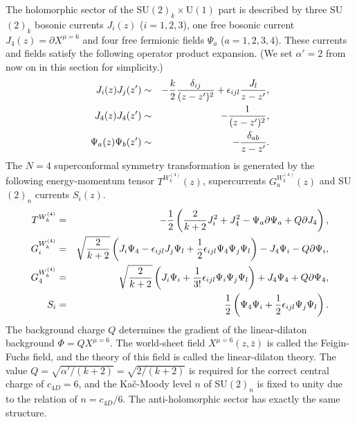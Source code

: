 \documentclass[a4paper,prd,preprint]{revtex4}
\begin{document}
The holomorphic sector of the SU$(2)_k \times$U$(1)$ part
 is described by three SU$(2)_k$ bosonic currents $J_i(z)$
 ($i = 1,2,3$), one free bosonic current $J_4(z)=\partial X^{\mu=6}$
 and four free fermionic fields $\Psi_a$ ($a=1,2,3,4$).
These currents and fields satisfy
 the following operator product expansion.
(We set $\alpha'=2$ from now on in this section for simplicity.)
\begin{eqnarray}
 J_i(z) J_j(z') &\sim&
  - { k \over 2} {{\delta_{ij}} \over {(z-z')^2}}
  + \epsilon_{ijl} {{J_l} \over {z-z'}},
\\
 J_4(z) J_4(z') &\sim& - {1 \over {(z-z')^2}},
\\
 \Psi_a(z) \Psi_b(z') &\sim& - {{\delta_{ab}} \over {z-z'}}.
\end{eqnarray}
The $N=4$ superconformal symmetry transformation is generated
 by the following energy-momentum tensor $T^{W^{(4)}_k}(z)$,
 supercurrents $G^{W^{(4)}_k}_a(z)$ and SU$(2)_n$ currents $S_i(z)$.
\begin{eqnarray}
 T^{W^{(4)}_k} &=&
  - {1 \over 2}
  \left(
   {2 \over {k+2}} J_i^2 + J_4^2
   - \Psi_a \partial \Psi_a + Q \partial J_4
  \right),
\\
 G^{W^{(4)}_k}_i &=&
  \sqrt{{2 \over {k+2}}}
   \left(
    J_i \Psi_4 - \epsilon_{ijl} J_j \Psi_l
    + {1 \over 2} \epsilon_{ijl} \Psi_4 \Psi_j \Psi_l
   \right)
  - J_4 \Psi_i - Q \partial \Psi_i,
\\
 G^{W^{(4)}_k}_4 &=&
  \sqrt{{2 \over {k+2}}}
   \left(
    J_i \Psi_i + {1 \over {3!}} \epsilon_{ijl} \Psi_i \Psi_j \Psi_l
   \right)
  + J_4 \Psi_4 + Q \partial \Psi_4,
\\
 S_i &=&
  {1 \over 2}
  \left(
   \Psi_4 \Psi_i + {1 \over 2} \epsilon_{ijl} \Psi_j \Psi_l
  \right).
\end{eqnarray}
The background charge $Q$
 determines the gradient of the linear-dilaton background
 $\Phi=QX^{\mu=6}$.
The world-sheet field $X^{\mu=6}(z,{\bar z})$
 is called the Feigin-Fuchs field,
 and the theory of this field is called the linear-dilaton theory.
The value $Q=\sqrt{\alpha'/(k+2)}=\sqrt{2/(k+2)}$ is required
 for the correct central charge of $c_{4D}=6$,
 and the Ka\v c-Moody level $n$ of SU$(2)_n$ is fixed to unity
 due to the relation of $n=c_{4D}/6$.
The anti-holomorphic sector has exactly the same structure.
\end{document}
